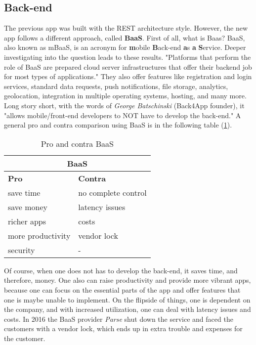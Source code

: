 \subsection{Back-end}
The previous app was built with the REST architecture style. However, the new app follows a different approach, called \textbf{BaaS}. First of all, what is Baas? BaaS, also known as mBaaS, is an acronym for \textbf{m}obile \textbf{B}ack-end \textbf{a}s \textbf{a} \textbf{S}ervice. Deeper investigating into the question leads to these results.
"Platforms that perform the role of BaaS are prepared cloud server infrastructures that offer their backend job for most types of applications." \cite{4mbaasCompare}
They also offer features like registration and login services, standard data requests, push notifications, file storage, analytics, geolocation, integration in multiple operating systems, hosting, and many more. Long story short, with the words of \textit{George Batschinski} (Back4App founder), it "allows mobile/front-end developers to NOT have to develop the back-end." \cite{baasCompare}
A general pro and contra comparison using BaaS is in the following table (\ref{tab:baasProCon}).

\begin{table}[h]
\centering
\begin{tabular}{|l|l|}
\hline
\multicolumn{2}{|c|}{\textbf{BaaS}}     \\ \hline
\textbf{Pro}      & \textbf{Contra}     \\ \hline
save time         & no complete control \\ \hline
save money        & latency issues      \\ \hline
richer apps       & costs               \\ \hline
more productivity & vendor lock         \\ \hline
security          & -		            \\ \hline
\end{tabular}
\label{tab:baasProCon}
\caption{Pro and contra BaaS}
\end{table}

Of course, when one does not has to develop the back-end, it saves time, and therefore, money. One also can raise productivity and provide more vibrant apps, because one can focus on the essential parts of the app and offer features that one is maybe unable to implement. On the flipside of things, one is dependent on the company, and with increased utilization, one can deal with latency issues and costs. In 2016 the BaaS provider \textit{Parse} shut down the service and faced the customers with a vendor lock, which ends up in extra trouble and expenses for the customer.  

